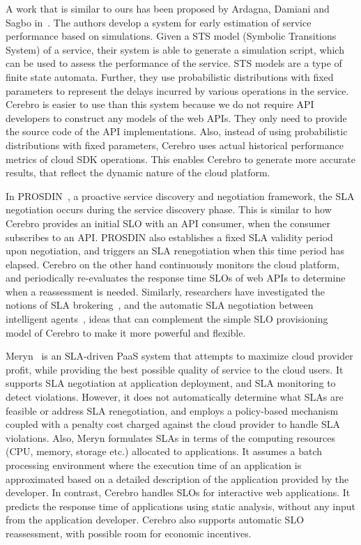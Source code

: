 A work that is similar to ours has been proposed by Ardagna, Damiani and Sagbo in~\cite{6649675}. 
The authors develop
a system for early estimation of service performance based on simulations. Given a STS
model (Symbolic Transitions System) of a service, their system is able to generate a simulation script, which
can be used to assess the performance of the service. STS models are a type of finite state automata. 
Further, they use probabilistic distributions with fixed parameters
to represent the delays incurred by various operations in the service. Cerebro is easier to use than this
system because we do not require API developers to construct any models of the web APIs. 
They only need to provide the source code of the API implementations. 
Also, instead of using probabilistic distributions
with fixed parameters, Cerebro uses actual historical performance metrics of cloud SDK operations. This enables
Cerebro to generate more accurate results, that reflect the dynamic nature of the cloud platform.

In PROSDIN~\cite{Mahbub:2011:PSN:2061042.2062022}, a proactive service discovery and negotiation
framework, the SLA negotiation occurs during the service discovery phase. This is similar to how
Cerebro provides an initial SLO with an API consumer, when the consumer subscribes to an API. PROSDIN also
establishes a fixed SLA validity period upon negotiation, and triggers an SLA renegotiation when this time period has 
elapsed. Cerebro on the other hand continuously monitors the cloud platform,
and periodically re-evaluates the response time SLOs of web APIs 
to determine when a reassessment is needed.
Similarly, researchers have investigated the notions of SLA brokering~\cite{6546098}, and the automatic SLA negotiation
between intelligent agents~\cite{Yaqub:2014:ONS:2680847.2681496}, ideas that can complement the
simple SLO provisioning model of Cerebro to make it more powerful and flexible.

Meryn~\cite{Dib:2013:MOS:2465823.2465825} is an SLA-driven PaaS system that attempts to maximize cloud
provider profit, while providing the best possible quality of service to the cloud users. It supports
SLA negotiation at application deployment, and SLA monitoring to detect
violations. However, it does not automatically determine what SLAs are
feasible or address SLA renegotiation, 
and employs a policy-based mechanism coupled
with a penalty cost charged against the cloud provider to
handle SLA violations. Also, Meryn formulates SLAs in terms of the computing resources (CPU, memory,
storage etc.) allocated to applications. It assumes a batch processing environment where the
execution time of an application is approximated based on a detailed description of the application provided
by the developer. In contrast, Cerebro handles SLOs for interactive web applications. It predicts
the response time of applications using static analysis, without any input from the application developer. 
Cerebro also supports automatic SLO reassessment, with possible room for economic incentives.


